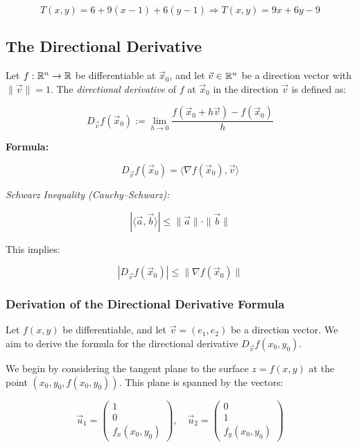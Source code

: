 \[
    T(x, y) = 6 + 9(x - 1) + 6(y - 1)
    \Rightarrow T(x, y) = 9x + 6y - 9
\]

\subsection{The Directional Derivative}

Let \( f : \mathbb{R}^n \to \mathbb{R} \) be differentiable at \( \vec{x}_0 \), 
and let \( \vec{v} \in \mathbb{R}^n \) be a direction vector with \( \|\vec{v}\| = 1 \). The 
\emph{directional derivative} of \(f\) at \( \vec{x}_0 \) in the direction \( \vec{v} \) is defined as:

\[
    D_{\vec{v}}f(\vec{x}_0) := \lim_{h \to 0} \frac{f(\vec{x}_0 + h\vec{v}) - f(\vec{x}_0)}{h}
\]

\textbf{Formula:}

\[
    D_{\vec{v}}f(\vec{x}_0) = \langle \nabla f(\vec{x}_0), \vec{v} \rangle
\]

\emph{Schwarz Inequality (Cauchy–Schwarz):}

\[
    |\langle \vec{a}, \vec{b} \rangle| \le \|\vec{a}\| \cdot \|\vec{b}\|
\]

This implies:

\[
    |D_{\vec{v}}f(\vec{x}_0)| \le \|\nabla f(\vec{x}_0)\|
\]

\subsubsection{Derivation of the Directional Derivative Formula}

Let \( f(x, y) \) be differentiable, and let \( \vec{v} = (e_1, e_2) \) be a direction vector. We aim to 
derive the formula for the directional derivative \( D_{\vec{v}} f(x_0, y_0) \).

We begin by considering the tangent plane to the surface \( z = f(x, y) \) at the point 
\( (x_0, y_0, f(x_0, y_0)) \). This plane is spanned by the vectors:

\[
    \vec{u}_1 = 
    \begin{pmatrix}
    1 \\
    0 \\
    f_x(x_0, y_0)
    \end{pmatrix}, \quad
    \vec{u}_2 = 
    \begin{pmatrix}
    0 \\
    1 \\
    f_y(x_0, y_0)
    \end{pmatrix}
\]

